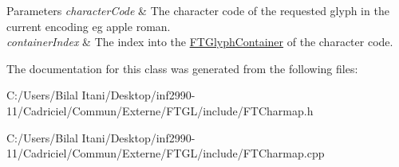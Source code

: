 \begin{DoxyParams}{Parameters}
{\em character\+Code} & The character code of the requested glyph in the current encoding eg apple roman. \\
\hline
{\em container\+Index} & The index into the \hyperlink{class_f_t_glyph_container}{F\+T\+Glyph\+Container} of the character code. \\
\hline
\end{DoxyParams}


The documentation for this class was generated from the following files\+:\begin{DoxyCompactItemize}
\item 
C\+:/\+Users/\+Bilal Itani/\+Desktop/inf2990-\/11/\+Cadriciel/\+Commun/\+Externe/\+F\+T\+G\+L/include/F\+T\+Charmap.\+h\item 
C\+:/\+Users/\+Bilal Itani/\+Desktop/inf2990-\/11/\+Cadriciel/\+Commun/\+Externe/\+F\+T\+G\+L/include/F\+T\+Charmap.\+cpp\end{DoxyCompactItemize}
